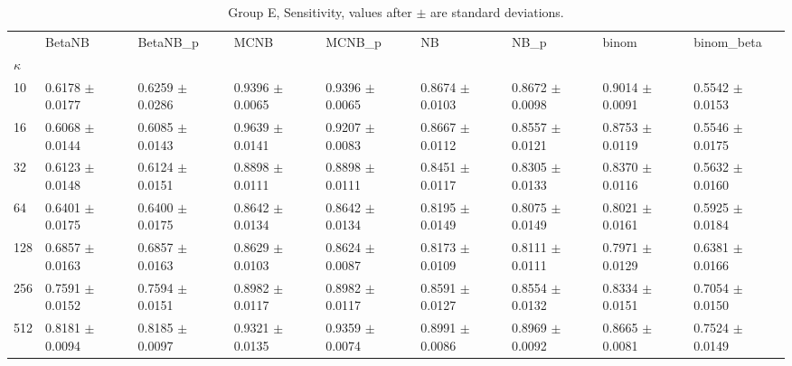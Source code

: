 \begin{table}[H]
\centering
\begin{adjustbox}{max width=\linewidth}
\begin{tabular}{lllllllll}
\toprule
 & BetaNB & BetaNB\_p & MCNB & MCNB\_p & NB & NB\_p & binom & binom\_beta \\
$\kappa$ &  &  &  &  &  &  &  &  \\
\midrule
10 & 0.6178 $\pm$ 0.0177 & 0.6259 $\pm$ 0.0286 & 0.9396 $\pm$ 0.0065 & 0.9396 $\pm$ 0.0065 & 0.8674 $\pm$ 0.0103 & 0.8672 $\pm$ 0.0098 & 0.9014 $\pm$ 0.0091 & 0.5542 $\pm$ 0.0153 \\
16 & 0.6068 $\pm$ 0.0144 & 0.6085 $\pm$ 0.0143 & 0.9639 $\pm$ 0.0141 & 0.9207 $\pm$ 0.0083 & 0.8667 $\pm$ 0.0112 & 0.8557 $\pm$ 0.0121 & 0.8753 $\pm$ 0.0119 & 0.5546 $\pm$ 0.0175 \\
32 & 0.6123 $\pm$ 0.0148 & 0.6124 $\pm$ 0.0151 & 0.8898 $\pm$ 0.0111 & 0.8898 $\pm$ 0.0111 & 0.8451 $\pm$ 0.0117 & 0.8305 $\pm$ 0.0133 & 0.8370 $\pm$ 0.0116 & 0.5632 $\pm$ 0.0160 \\
64 & 0.6401 $\pm$ 0.0175 & 0.6400 $\pm$ 0.0175 & 0.8642 $\pm$ 0.0134 & 0.8642 $\pm$ 0.0134 & 0.8195 $\pm$ 0.0149 & 0.8075 $\pm$ 0.0149 & 0.8021 $\pm$ 0.0161 & 0.5925 $\pm$ 0.0184 \\
128 & 0.6857 $\pm$ 0.0163 & 0.6857 $\pm$ 0.0163 & 0.8629 $\pm$ 0.0103 & 0.8624 $\pm$ 0.0087 & 0.8173 $\pm$ 0.0109 & 0.8111 $\pm$ 0.0111 & 0.7971 $\pm$ 0.0129 & 0.6381 $\pm$ 0.0166 \\
256 & 0.7591 $\pm$ 0.0152 & 0.7594 $\pm$ 0.0151 & 0.8982 $\pm$ 0.0117 & 0.8982 $\pm$ 0.0117 & 0.8591 $\pm$ 0.0127 & 0.8554 $\pm$ 0.0132 & 0.8334 $\pm$ 0.0151 & 0.7054 $\pm$ 0.0150 \\
512 & 0.8181 $\pm$ 0.0094 & 0.8185 $\pm$ 0.0097 & 0.9321 $\pm$ 0.0135 & 0.9359 $\pm$ 0.0074 & 0.8991 $\pm$ 0.0086 & 0.8969 $\pm$ 0.0092 & 0.8665 $\pm$ 0.0081 & 0.7524 $\pm$ 0.0149 \\
\bottomrule
\end{tabular}

\end{adjustbox}
\caption{Group E, Sensitivity, values after $\pm$ are standard deviations.}
\end{table}

